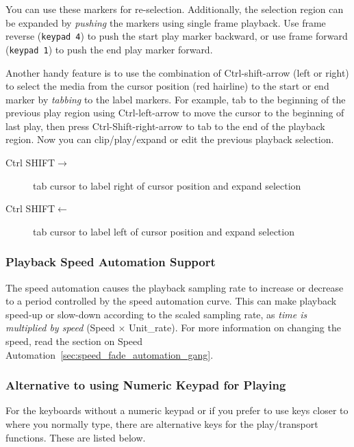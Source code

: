 You can use these markers for re-selection.  
Additionally, the selection region can be expanded by \textit{pushing} the markers using single frame playback.  
Use frame reverse (\texttt{keypad 4}) to push the start play marker backward, or use frame forward (\texttt{keypad 1}) to push the end play marker forward.

Another handy feature is to use the combination of Ctrl-shift-arrow (left or right) to select the media from the cursor position (red hairline) to the start or end marker by \textit{tabbing} to the label markers.  
For example, tab to the beginning of the previous play region using Ctrl-left-arrow to move the cursor to the beginning of last play, then press Ctrl-Shift-right-arrow to tab to the end of the playback region. 
Now you can clip/play/expand or edit the previous playback selection.

\begin{description}
    \item[Ctrl SHIFT$\rightarrow$] 	  tab cursor to label right of cursor position and expand selection
    \item[Ctrl SHIFT$\leftarrow$] 	  tab cursor to label left of cursor position and expand selection
\end{description}


\subsubsection*{Playback Speed Automation Support}%
\label{ssub:playback_speed_automation_support}


The speed automation causes the playback sampling rate to increase or decrease to a period controlled by the speed automation curve.  
This can make playback speed-up or slow-down according to the scaled sampling rate, as \textit{time is multiplied by speed} (Speed $\times$ Unit\_rate). For more information on changing
the speed, read the section on Speed Automation~\ref{sec:speed_fade_automation_gang}.

\subsubsection*{Alternative to using Numeric Keypad for Playing}%
\label{ssub:alternative_to_using_numeric_keypad_for_playing}


For the keyboards without a numeric keypad or if you prefer to use keys closer to where you normally type, there are alternative keys for the play/transport functions.  These are listed below.

